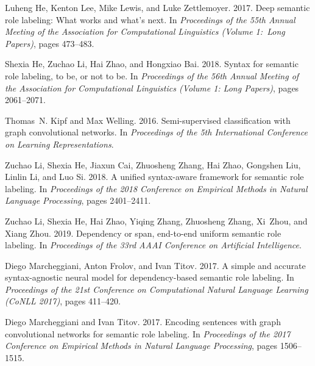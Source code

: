 \documentclass[11pt,a4paper]{article}
\begin{document}
\begin{thebibliography}{25}
Luheng He, Kenton Lee, Mike Lewis, and Luke Zettlemoyer. 2017.
\newblock Deep semantic role labeling: What works and what{'}s next.
\newblock In \emph{Proceedings of the 55th Annual Meeting of the Association
  for Computational Linguistics (Volume 1:\ Long Papers)}, pages 473--483.

Shexia He, Zuchao Li, Hai Zhao, and Hongxiao Bai. 2018{}.
\newblock Syntax for semantic role labeling, to be, or not to be.
\newblock In \emph{Proceedings of the 56th Annual Meeting of the Association
  for Computational Linguistics (Volume 1: Long Papers)}, pages 2061--2071.

Thomas~N. Kipf and Max Welling. 2016.
\newblock Semi-supervised classification with graph convolutional networks.
\newblock In \emph{Proceedings of the 5th International Conference on Learning
  Representations}.

Zuchao Li, Shexia He, Jiaxun Cai, Zhuosheng Zhang, Hai Zhao, Gongshen Liu,
  Linlin Li, and Luo Si. 2018.
\newblock A unified syntax-aware framework for semantic role labeling.
\newblock In \emph{Proceedings of the 2018 Conference on Empirical Methods in
  Natural Language Processing}, pages 2401--2411.

Zuchao Li, Shexia He, Hai Zhao, Yiqing Zhang, Zhuosheng Zhang, Xi~Zhou, and
  Xiang Zhou. 2019.
\newblock Dependency or span, end-to-end uniform semantic role labeling.
\newblock In \emph{Proceedings of the 33rd AAAI Conference on Artificial
  Intelligence}.

Diego Marcheggiani, Anton Frolov, and Ivan Titov. 2017.
\newblock A simple and accurate syntax-agnostic neural model for
  dependency-based semantic role labeling.
\newblock In \emph{Proceedings of the 21st Conference on Computational Natural
  Language Learning (CoNLL 2017)}, pages 411--420.

Diego Marcheggiani and Ivan Titov. 2017.
\newblock Encoding sentences with graph convolutional networks for semantic
  role labeling.
\newblock In \emph{Proceedings of the 2017 Conference on Empirical Methods in
  Natural Language Processing}, pages 1506--1515.


\end{thebibliography}
\end{document}
